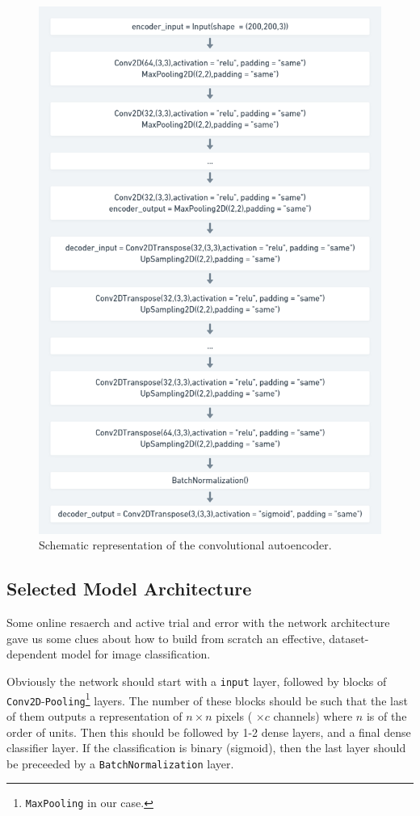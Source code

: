\documentclass[aps,twocolumn,secnumarabic,nobalancelastpage,amsmath,amssymb,
nofootinbib]{revtex4}
\begin{document}
\begin{figure}
	\centering
	\includegraphics[width=0.7\linewidth]{Images/AEShort}
	\caption{Schematic representation of the convolutional autoencoder.}\label{fig:ae}
\end{figure}

\subsection{Selected Model Architecture}\label{model-architecture}

Some online resaerch and active trial and error with the network
architecture gave us some clues about how to build from scratch an
effective, dataset-dependent model for image classification.

Obviously the network should start with a \texttt{input} layer, followed
by blocks of \texttt{Conv2D}-\texttt{Pooling}\footnote{\texttt{MaxPooling}
in our case.} layers. The number of these blocks should be such that
the last of them outputs a representation of \(n \times n\) pixels (
\(\times c\) channels) where \(n\) is of the order of units. Then this
should be followed by 1-2 dense layers, and a final dense classifier
layer. If the classification is binary (sigmoid), then the last layer
should be preceeded by a \texttt{BatchNormalization} layer.
\end{document}
